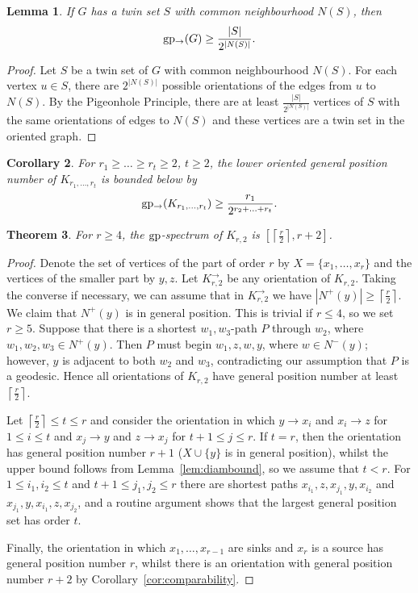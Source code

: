 \documentclass[a4paper,12pt]{article}
\newtheorem{theorem}{Theorem}[section]
\newtheorem{lemma}[theorem]{Lemma}
\newtheorem{corollary}[theorem]{Corollary}
\theoremstyle{definition}
\newcommand{\gp}{{\rm gp}}
\newcommand{\lgp}{{\rm gp_{\rightarrow }}}
\begin{document}
	\begin{lemma}
		If $G$ has a twin set $S$ with common neighbourhood $N(S)$, then \[ \lgp (G) \geq \frac{|S|}{2^{|N(S)|}}.\]   
	\end{lemma}
	\begin{proof}
		Let $S$ be a twin set of $G$ with common neighbourhood $N(S)$. For each vertex $u \in S$, there are $2^{|N(S)|}$ possible orientations of the edges from $u$ to $N(S)$. By the Pigeonhole Principle, there are at least $\frac{|S|}{2^{|N(S)|}}$ vertices of $S$ with the same orientations of edges to $N(S)$ and these vertices are a twin set in the oriented graph. 
	\end{proof}
	
	\begin{corollary}
		For $r_1 \geq \ldots \geq r_t \geq 2$, $t \geq 2$, the lower oriented general position number of $K_{r_1,\ldots ,r_t}$ is bounded below by \[ \lgp (K_{r_1,\ldots ,r_t}) \geq \frac{r_1}{2^{r_2+\ldots +r_t}}.\] 
	\end{corollary}
	
	\begin{theorem}
		For $r \geq 4$, the $\gp $-spectrum of $K_{r,2}$ is $[\left \lceil \frac{r}{2} \right \rceil ,r+2]$.
	\end{theorem}
	\begin{proof}
		Denote the set of vertices of the part of order $r$ by $X = \{ x_1,\ldots ,x_r\} $ and the vertices of the smaller part by $y,z$. Let $K_{r,2}^{\rightarrow }$ be any orientation of $K_{r,2}$. Taking the converse if necessary, we can assume that in $K_{r,2}^{\rightarrow }$ we have $|N^+(y)| \geq   \left \lceil \frac{r}{2} \right \rceil $. We claim that $N^+(y)$ is in general position. This is trivial if $r \leq 4$, so we set $r \geq 5$. Suppose that there is a shortest $w_1,w_3$-path $P$ through $w_2$, where $w_1,w_2,w_3 \in N^+(y)$. Then $P$ must begin $w_1,z,w,y$, where $w \in N^-(y)$; however, $y$ is adjacent to both $w_2$ and $w_3$, contradicting our assumption that $P$ is a geodesic. Hence all orientations of $K_{r,2}$ have general position number at least $\left \lceil \frac{r}{2} \right \rceil $.
		
		Let $\left \lceil \frac{r}{2} \right \rceil \leq t \leq r$ and consider the orientation in which $y \rightarrow x_i$ and $x_i \rightarrow z$ for $1 \leq i \leq t$ and $x_j \rightarrow y$ and $z \rightarrow x_j$ for $t+1 \leq j \leq r$. If $t = r$, then the orientation has general position number $r+1$ ($X \cup \{ y\} $ is in general position), whilst the upper bound follows from Lemma~\ref{lem:diambound}, so we assume that $t < r$. For $1 \leq i_1,i_2 \leq t$ and $t+1 \leq j_1,j_2 \leq r$ there are shortest paths $x_{i_1},z,x_{j_1},y,x_{i_2}$ and $x_{j_1},y,x_{i_1},z,x_{j_2}$, and a routine argument shows that the largest general position set has order $t$. 
		
		Finally, the orientation in which $x_1,\ldots ,x_{r-1}$ are sinks and $x_r$ is a source has general position number $r$, whilst there is an orientation with general position number $r+2$ by Corollary~\ref{cor:comparability}.
	\end{proof}
	
\end{document}
